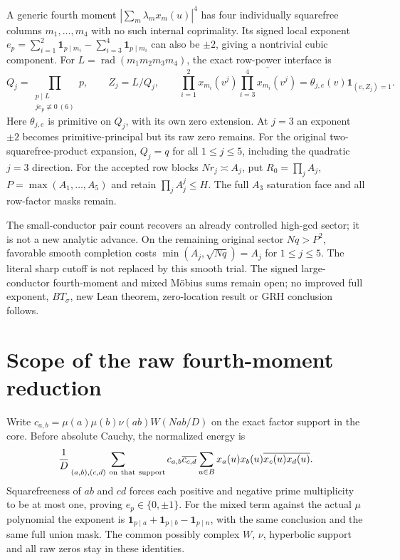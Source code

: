 \documentclass[11pt]{article}
\theoremstyle{definition}\newtheorem{definition}[theorem]{Definition}
\theoremstyle{remark}\newtheorem{remark}[theorem]{Remark}
\begin{document}
A generic fourth moment $|\sum_m\lambda_mx_m(u)|^4$ has four individually
squarefree columns $m_1,\ldots,m_4$ with no such internal coprimality.
Its signed local exponent
$e_p=\sum_{i=1}^2\mathbf1_{p\mid m_i}-\sum_{i=3}^4\mathbf1_{p\mid m_i}$
can also be $\pm2$, giving a nontrivial cubic component. For $L=\operatorname{rad}(m_1m_2m_3m_4)$, the exact row-power
interface is
\[
 Q_j=\prod_{\substack{p\mid L\\je_p\not\equiv0\ (6)}}p,\qquad
 Z_j=L/Q_j,\qquad
 \prod_{i=1}^2x_{m_i}(v^j)
       \overline{\prod_{i=3}^4x_{m_i}(v^j)}
 =\theta_{j,e}(v)\mathbf1_{(v,Z_j)=1}.
\]
Here $\theta_{j,e}$ is primitive on $Q_j$, with its own zero extension.
At $j=3$ an exponent $\pm2$ becomes primitive-principal but its raw
zero remains. For the original two-squarefree-product expansion,
$Q_j=q$ for all $1\le j\le5$, including the quadratic $j=3$ direction.
For the accepted row blocks $Nr_j\asymp A_j$, put
$R_0=\prod_jA_j$, $P=\max(A_1,\ldots,A_5)$ and retain
$\prod_jA_j^j\le H$. The full $A_3$ saturation face and all row-factor
masks remain.

The small-conductor pair count recovers an already controlled high-gcd
sector; it is not a new analytic advance. On the remaining original
sector $Nq>P^2$, favorable smooth completion
costs $\min(A_j,\sqrt{Nq})=A_j$ for $1\le j\le5$.
The literal sharp cutoff is not replaced by this smooth trial.
The signed large-conductor fourth-moment and mixed M\"obius sums remain
open; no improved full exponent, $BT_\sigma$, new Lean theorem,
zero-location result or GRH conclusion follows.

\section{Scope of the raw fourth-moment reduction}
\label{upq:details}
Write $c_{a,b}=\mu(a)\mu(b)\nu(ab)W(Nab/D)$ on the exact factor support
in the core. Before absolute Cauchy, the normalized energy is
\[
 \frac1D\sum_{\substack{(a,b),(c,d)\ {\rm on\ that\ support}}}
 c_{a,b}\overline{c_{c,d}}
 \sum_{u\in B}x_a(u)x_b(u)\overline{x_c(u)x_d(u)}.
\]
Squarefreeness of $ab$ and $cd$ forces each positive and negative
prime multiplicity to be at most one, proving $e_p\in\{0,\pm1\}$.
For the mixed term against the actual $\mu$ polynomial the exponent is
$\mathbf1_{p\mid a}+\mathbf1_{p\mid b}-\mathbf1_{p\mid n}$,
with the same conclusion and the same full union mask.
The common possibly complex $W$, $\nu$, hyperbolic support and all raw
zeros stay in these identities.
\end{document}
